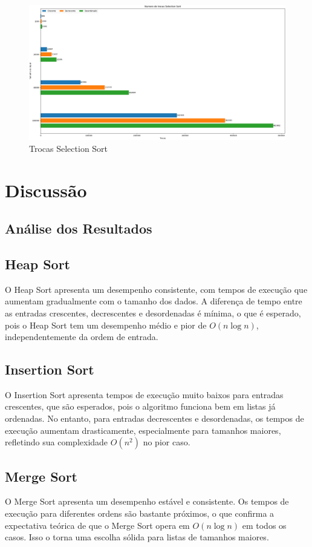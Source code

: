 \documentclass[12pt,a4paper]{article}
\begin{document}
\begin{figure}[H]
    \centering
    \includegraphics[width=\textwidth]{Graficos/Trocas/Selection Sort.png}
    \caption{Trocas Selection Sort}
    \label{fig:trocasSelectionSort}
\end{figure}


\section{Discussão}
\subsection{Análise dos Resultados}

\subsection{Heap Sort}
O Heap Sort apresenta um desempenho consistente, com tempos de execução que aumentam gradualmente com o tamanho dos dados. A diferença de tempo entre as entradas crescentes, decrescentes e desordenadas é mínima, o que é esperado, pois o Heap Sort tem um desempenho médio e pior de \(O(n \log n)\), independentemente da ordem de entrada.

\subsection{Insertion Sort}
O Insertion Sort apresenta tempos de execução muito baixos para entradas crescentes, que são esperados, pois o algoritmo funciona bem em listas já ordenadas. No entanto, para entradas decrescentes e desordenadas, os tempos de execução aumentam drasticamente, especialmente para tamanhos maiores, refletindo sua complexidade \(O(n^2)\) no pior caso.

\subsection{Merge Sort}
O Merge Sort apresenta um desempenho estável e consistente. Os tempos de execução para diferentes ordens são bastante próximos, o que confirma a expectativa teórica de que o Merge Sort opera em \(O(n \log n)\) em todos os casos. Isso o torna uma escolha sólida para listas de tamanhos maiores.
\end{document}
